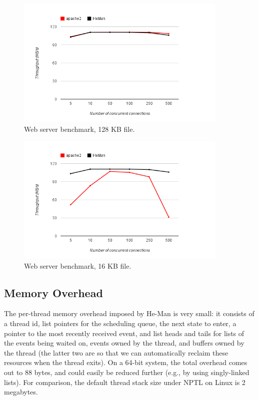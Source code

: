 \documentclass[preprint,10pt]{sigplanconf}
\begin{document}
\begin{figure}[!ht]
\centering
\includegraphics[width=0.9\textwidth]{128kb_graph.png}
\caption{Web server benchmark, 128 KB file.}
\label{fig:graph128}
\end{figure}
\begin{figure}[!ht]
\centering
\includegraphics[width=0.9\textwidth]{16kb_graph.png}
\caption{Web server benchmark, 16 KB file.}
\label{fig:graph16}
\end{figure}

\subsection{Memory Overhead}

The per-thread memory overhead imposed by He-Man is very small: it
consists of a thread id, list pointers for the scheduling queue, the
next state to enter, a pointer to the most recently received event,
and list heads and tails for lists of the events being waited on,
events owned by the thread, and buffers owned by the thread (the
latter two are so that we can automatically reclaim these resources
when the thread exits). On a 64-bit system, the total overhead comes
out to 88 bytes, and could easily be reduced further (e.g., by using
singly-linked lists).  For comparison, the default thread stack size
under NPTL on Linux is 2 megabytes.
\end{document}
